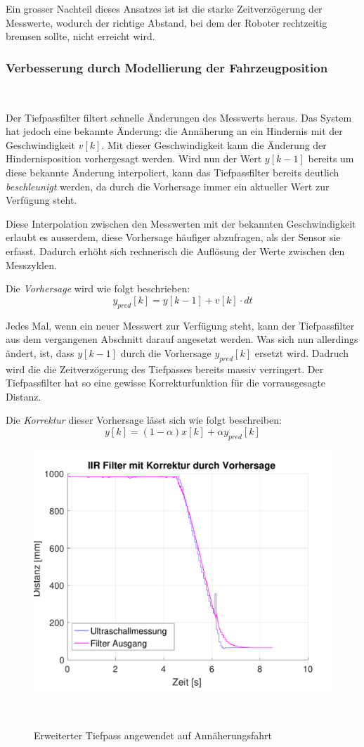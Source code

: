 \documentclass[main.tex]{subfiles} %
\begin{document}
Ein grosser Nachteil dieses Ansatzes ist ist die starke Zeitverzögerung der
Messwerte, wodurch der richtige Abstand, bei dem der Roboter rechtzeitig
bremsen sollte, nicht erreicht wird.

\subsubsection*{Verbesserung durch Modellierung der Fahrzeugposition}~\label{apdx:Adaptiver_Tiefpass}

Der Tiefpassfilter filtert schnelle Änderungen des Messwerts heraus. Das System
hat jedoch eine bekannte Änderung: die Annäherung an ein Hindernis mit der
Geschwindigkeit $v[k]$. Mit dieser Geschwindigkeit kann die Änderung der
Hindernisposition vorhergesagt werden. Wird nun der Wert $y[k - 1]$ bereits um
diese bekannte Änderung interpoliert, kann das Tiefpassfilter bereits deutlich
\textit{beschleunigt} werden, da durch die Vorhersage immer ein aktueller Wert
zur Verfügung steht.

Diese Interpolation zwischen den Messwerten mit der bekannten Geschwindigkeit
erlaubt es ausserdem, diese Vorhersage häufiger abzufragen, als der Sensor sie
erfasst. Dadurch erhöht sich rechnerisch die Auflösung der Werte zwischen den
Messzyklen.

Die \textit{Vorhersage} wird wie folgt beschrieben:
\[
    y_{pred}[k] = y[k - 1] + v[k] \cdot dt
\]

Jedes Mal, wenn ein neuer Messwert zur Verfügung steht, kann der Tiefpassfilter
aus dem vergangenen Abschnitt darauf angesetzt werden. Was sich nun allerdings
ändert, ist, dass $y[k - 1]$ durch die Vorhersage $y_{pred}[k]$ ersetzt wird.
Dadruch wird die die Zeitverzögerung des Tiefpasses bereits massiv verringert.
Der Tiefpassfilter hat so eine gewisse Korrekturfunktion für die vorrausgesagte
Distanz.

Die \textit{Korrektur} dieser Vorhersage lässt sich wie folgt beschreiben:
\[
    y[k] = (1 - \alpha) x[k] + \alpha y_{pred}[k]
\]

\begin{figure}[H]
    \centering
    \includegraphics[width=0.5\linewidth]{./fig_Parametrierung_HcSr04/Einfacher_Tiefpass_HcSr04_Erweitert_durch_Modell.pdf}
    \caption{Erweiterter Tiefpass angewendet auf Annäherungsfahrt}~\label{fig:EinfacherTiefpassHcSr04_Erweitert}
\end{figure}
\end{document}
